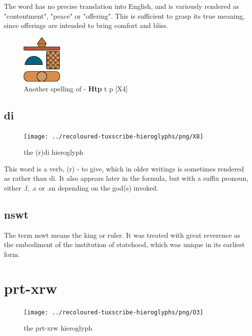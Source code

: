 The word  has no precise translation into English, and is variously rendered as "contentment", "peace" or "offering". This is sufficient to grasp its true meaning, since offerings are intended to bring comfort and bliss.

\begin{figure} [H]
	\centering
	\includegraphics[width=0.175\textwidth]{../images/htp2}
	\caption{Another spelling of  - \textbf{Htp} t p [X4]}
\end{figure}

\subsection*{di}

\begin{figure} [H]
	\centering
	\texttt{[image: ../recoloured-tuxscribe-hieroglyphs/png/X8]}
	\caption{the (r)di hieroglyph}
\end{figure}

This word is a verb, (r) - to give, which in older writings is sometimes rendered as  rather than di. It also appears later in the formula, but with a suffix pronoun, either .f, .s or .sn depending on the god(s) invoked.

\subsection*{nswt}

The term nswt means the king or ruler. It was treated with great reverence as the embodiment of the institution of statehood, which was unique in its earliest form.

\section*{prt-xrw}

\begin{figure} [H]
	\centering
	\texttt{[image: ../recoloured-tuxscribe-hieroglyphs/png/O3]}
	\caption{the prt-xrw hieroglyph}
\end{figure}

